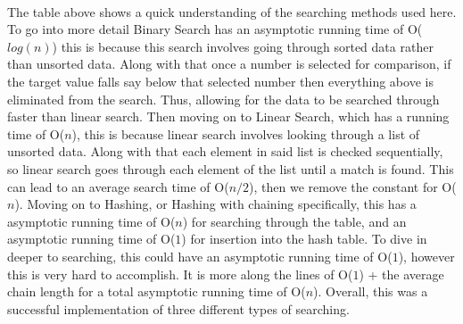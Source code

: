 \documentclass[letterpaper, 10pt,DIV=13]{scrartcl}
\numberwithin{equation}{section} %
\numberwithin{figure}{section} %
\numberwithin{table}{section} %
\begin{document}
\paragraph{} The table above shows a quick understanding of the searching methods used here. To go into more detail Binary Search has an asymptotic running time of  O($log(n)$) this is because this search involves going through sorted data rather than unsorted data. Along with that once a number is selected for comparison, if the target value falls say below that selected number then everything above is eliminated from the search. Thus, allowing for the data to be searched through faster than linear search. Then moving on to Linear Search, which has a running time of O($n$), this is because linear search involves looking through a list of unsorted data. Along with that each element in said list is checked sequentially, so linear search goes through each element of the list until a match is found. This can lead to an average search time of O($n/2$), then we remove the constant for O($n$). Moving on to Hashing, or Hashing with chaining specifically, this has a asymptotic running time of O($n$) for searching through the table, and an asymptotic running time of O($1$) for insertion into the hash table. To dive in deeper to searching, this could have an asymptotic running time of O($1$), however this is very hard to accomplish. It is more along the lines of O($1$) + the average chain length for a total asymptotic running time of O($n$). Overall, this was a successful implementation of three different types of searching.




 

\pagebreak
\end{document}
